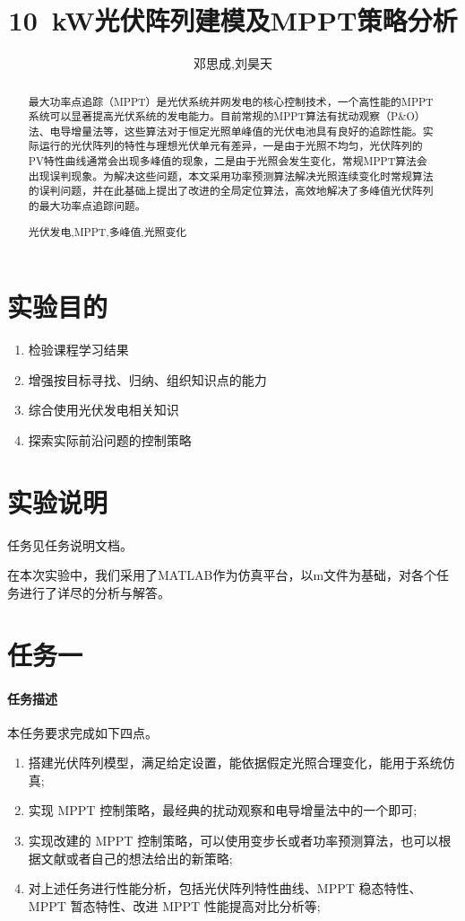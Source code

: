 \documentclass[a4paper,12pt]{article}
\title{\SI{10}{\kW}光伏阵列建模及MPPT策略分析}
\author{邓思成,刘昊天}
\begin{document}
    \begin{abstract}
        最大功率点追踪（MPPT）是光伏系统并网发电的核心控制技术，一个高性能的MPPT系统可以显著提高光伏系统的发电能力。目前常规的MPPT算法有扰动观察（P\&O）法、电导增量法等，这些算法对于恒定光照单峰值的光伏电池具有良好的追踪性能。实际运行的光伏阵列的特性与理想光伏单元有差异，一是由于光照不均匀，光伏阵列的PV特性曲线通常会出现多峰值的现象，二是由于光照会发生变化，常规MPPT算法会出现误判现象。为解决这些问题，本文采用功率预测算法解决光照连续变化时常规算法的误判问题，并在此基础上提出了改进的全局定位算法，高效地解决了多峰值光伏阵列的最大功率点追踪问题。
        \begin{keywords}
            光伏发电,MPPT,多峰值,光照变化
        \end{keywords}
    \end{abstract}
    \maketitle
    \section{实验目的} %
    \label{sec:实验目的}
    \begin{enumerate}[noitemsep, topsep=0pt]
        \item 检验课程学习结果
        \item 增强按目标寻找、归纳、组织知识点的能力
        \item 综合使用光伏发电相关知识
        \item 探索实际前沿问题的控制策略
    \end{enumerate}
    \section{实验说明} %
    \label{sec:实验说明}
    任务见任务说明文档。

    在本次实验中，我们采用了MATLAB作为仿真平台，以m文件为基础，对各个任务进行了详尽的分析与解答。
    \section{任务一} %
    \label{sec:任务一}
    \paragraph{任务描述} %
    本任务要求完成如下四点。
    \begin{enumerate}[noitemsep,topsep=0pt]
    \item 搭建光伏阵列模型，满足给定设置，能依据假定光照合理变化，能用于系统仿真;
    \item 实现 MPPT 控制策略，最经典的扰动观察和电导增量法中的一个即可;
    \item 实现改建的 MPPT 控制策略，可以使用变步长或者功率预测算法，也可以根据文献或者自己的想法给出的新策略;
    \item 对上述任务进行性能分析，包括光伏阵列特性曲线、MPPT 稳态特性、MPPT 暂态特性、改进 MPPT 性能提高对比分析等;
    \end{enumerate}
\end{document}
